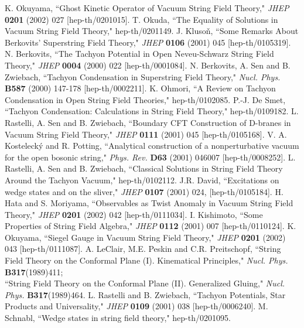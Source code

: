 \documentclass[a4paper,12pt]{article}
\begin{document}
\begin{thebibliography}{999}
K. Okuyama, ``Ghost Kinetic Operator of Vacuum String Field Theory," \textit{JHEP} 
 \textbf{0201} (2002) 027 [hep-th/0201015]. 
T. Okuda, ``The Equality of Solutions in Vacuum String Field Theory," hep-th/0201149. 
J. Kluso\v{n}, ``Some Remarks About Berkovits' Superstring Field Theory," \textit{JHEP} 
 \textbf{0106} (2001) 045 [hep-th/0105319].
N. Berkovits, ``The Tachyon Potential in Open Neveu-Schwarz String 
 Field Theory," \textit{JHEP} \textbf{0004} (2000) 022 [hep-th/0001084].
N. Berkovits, A. Sen and B. Zwiebach, ``Tachyon Condensation in 
 Superstring Field Theory," \textit{Nucl. Phys.} \textbf{B587} (2000) 147-178 [hep-th/0002211].
K. Ohmori, ``A Review on Tachyon Condensation in Open String Field Theories," 
 hep-th/0102085.
P.-J. De Smet, ``Tachyon Condensation: Calculations in String Field Theory," hep-th/0109182.
L. Rastelli, A. Sen and B. Zwiebach, ``Boundary CFT Construction of D-branes 
 in Vacuum String Field Theory," \textit{JHEP} \textbf{0111} (2001) 045 [hep-th/0105168]. 
V. A. Kosteleck\'{y} and R. Potting, ``Analytical construction 
 of a nonperturbative vacuum for the open bosonic string," \textit{Phys. Rev.} 
 \textbf{D63} (2001) 046007 [hep-th/0008252].
L. Rastelli, A. Sen and B. Zwiebach, ``Classical Solutions in String Field Theory  
 Around the Tachyon Vacuum," hep-th/0102112.
J.R. David, ``Excitations on wedge states and on the sliver," \textit{JHEP} \textbf{0107} 
 (2001) 024, [hep-th/0105184].
H. Hata and S. Moriyama, ``Observables as Twist Anomaly in Vacuum String Field Theory," 
 \textit{JHEP} \textbf{0201} (2002) 042 [hep-th/0111034].
I. Kishimoto, ``Some Properties of String Field Algebra," \textit{JHEP} \textbf{0112} 
 (2001) 007 [hep-th/0110124].
K. Okuyama, ``Siegel Gauge in Vacuum String Field Theory," \textit{JHEP} 
 \textbf{0201} (2002) 043 [hep-th/0111087].
A. LeClair, M.E. Peskin and C.R. Preitschopf, ``String Field 
 Theory on the Conformal Plane (I). Kinematical Principles," 
 \textit{Nucl. Phys.} \textbf{B317}(1989)411; \vspace{1mm} \\ 
 ``String Field Theory on the Conformal Plane (II). Generalized 
 Gluing," \textit{Nucl. Phys.} \textbf{B317}(1989)464.
L. Rastelli and B. Zwiebach, ``Tachyon Potentials, Star Products and 
 Universality," \textit{JHEP} \textbf{0109} (2001) 038 [hep-th/0006240].
M. Schnabl, ``Wedge states in string field theory," hep-th/0201095.

\end{thebibliography}
\end{document}
